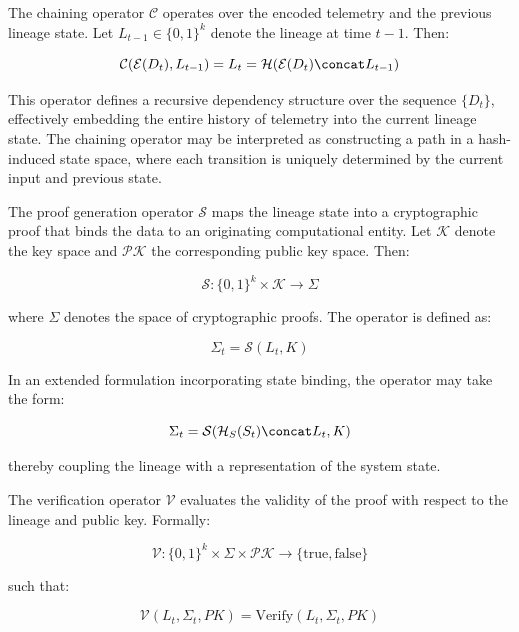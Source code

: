 The chaining operator $\mathcal{C}$ operates over the encoded telemetry and the previous lineage state. Let $L_{t-1} \in \{0,1\}^k$ denote the lineage at time $t-1$. Then:

\begin{equation}
\mathcal{C}(\mathcal{E}(D_t), L_{t-1}) = L_t = \mathcal{H}(\mathcal{E}(D_t) \concat L_{t-1})
\end{equation}

This operator defines a recursive dependency structure over the sequence $\{D_t\}$, effectively embedding the entire history of telemetry into the current lineage state. The chaining operator may be interpreted as constructing a path in a hash-induced state space, where each transition is uniquely determined by the current input and previous state.

The proof generation operator $\mathcal{S}$ maps the lineage state into a cryptographic proof that binds the data to an originating computational entity. Let $\mathcal{K}$ denote the key space and $\mathcal{PK}$ the corresponding public key space. Then:

\begin{equation}
\mathcal{S}: \{0,1\}^k \times \mathcal{K} \rightarrow \Sigma
\end{equation}

where $\Sigma$ denotes the space of cryptographic proofs. The operator is defined as:

\begin{equation}
\Sigma_t = \mathcal{S}(L_t, K)
\end{equation}

In an extended formulation incorporating state binding, the operator may take the form:

\begin{equation}
\Sigma_t = \mathcal{S}(\mathcal{H}_S(S_t) \concat L_t, K)
\end{equation}

thereby coupling the lineage with a representation of the system state.

The verification operator $\mathcal{V}$ evaluates the validity of the proof with respect to the lineage and public key. Formally:

\begin{equation}
\mathcal{V}: \{0,1\}^k \times \Sigma \times \mathcal{PK} \rightarrow \{\text{true}, \text{false}\}
\end{equation}

such that:

\begin{equation}
\mathcal{V}(L_t, \Sigma_t, PK) = \text{Verify}(L_t, \Sigma_t, PK)
\end{equation}

